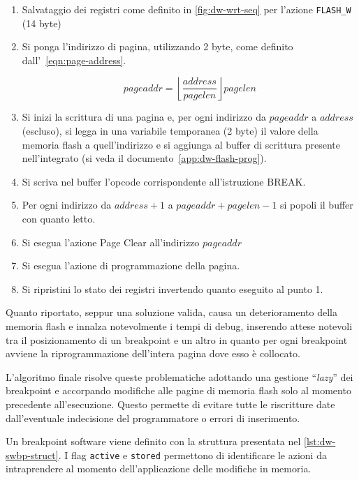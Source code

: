 \begin{enumerate}
    \item Salvataggio dei registri come definito in \cref{fig:dw-wrt-seq} per l'azione \texttt{FLASH\_W} (14 byte)
    \item Si ponga l'indirizzo di pagina, utilizzando 2 byte, come definito dall'~\cref{eqn:page-address}.
    
    \begin{equation}\label{eqn:page-address}
    pageaddr = \left\lfloor\frac{address}{pagelen}\right\rfloor pagelen
    \end{equation}

    \item Si inizi la scrittura di una pagina e, per ogni indirizzo da \(pageaddr\) a \(address\) (escluso), si legga in una variabile temporanea (2 byte) il valore della memoria flash a quell'indirizzo e si aggiunga al buffer di scrittura presente nell'integrato (si veda il documento~\ref{app:dw-flash-prog}).
    \item Si scriva nel buffer l'opcode corrispondente all'istruzione BREAK.\@ 
    \item Per ogni indirizzo da \(address + 1\) a \(pageaddr + pagelen - 1\) si popoli il buffer con quanto letto. 
    \item Si esegua l'azione Page Clear all'indirizzo \(pageaddr\)
    \item Si esegua l'azione di programmazione della pagina.
    \item Si ripristini lo stato dei registri invertendo quanto eseguito al punto 1.
\end{enumerate}

Quanto riportato, seppur una soluzione valida, causa un deterioramento della memoria flash e innalza notevolmente i tempi di debug, inserendo attese notevoli tra il posizionamento di un breakpoint e un altro in quanto per ogni breakpoint avviene la riprogrammazione dell'intera pagina dove esso è collocato.

L'algoritmo finale risolve queste problematiche adottando una gestione ``\textit{lazy}'' dei breakpoint e accorpando modifiche alle pagine di memoria flash solo al momento precedente all'esecuzione.
Questo permette di evitare tutte le riscritture date dall'eventuale indecisione del programmatore o errori di inserimento.

Un breakpoint software viene definito con la struttura presentata nel \cref{lst:dw-swbp-struct}. I flag \texttt{active} e \texttt{stored} permettono di identificare le azioni da intraprendere al momento dell'applicazione delle modifiche in memoria.

